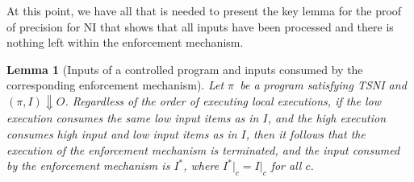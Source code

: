\documentclass[10pt,a4paper,oneside]{article}
\newtheorem{lemma}{Lemma}[section]
\def\execution#1#2#3{\ensuremath{(#1, #2)\Downarrow#3}}
\def\channeleq#1#2#3{\ensuremath{\restrict{#1}{#3} = \restrict{#2}{#3}}}
\def\restrict#1#2{\ensuremath{{#1}|_{#2}}}
\def\chnl{\ensuremath{c}}
\def\Prog{\ensuremath{\pi}}
\begin{document}
At this point, we have all that is needed to present the key lemma for the proof of precision for NI that shows that all inputs have been processed and there is nothing left within the enforcement mechanism.


\begin{lemma}[Inputs of a controlled program and inputs consumed by the corresponding enforcement mechanism]\label{lem:ni:running}
Let \Prog\ be a program satisfying TSNI and \execution{\Prog}{I}{O}. Regardless of the order of executing local executions, if the low execution consumes the same low input items as in $I$, and the high execution consumes high input and low input items as in $I$, then it follows that the execution of the enforcement mechanism is terminated, and the input consumed by the enforcement mechanism is $I^*$, where \channeleq{I^*}{I}{\chnl} for all \chnl.



\end{lemma}
\end{document}
